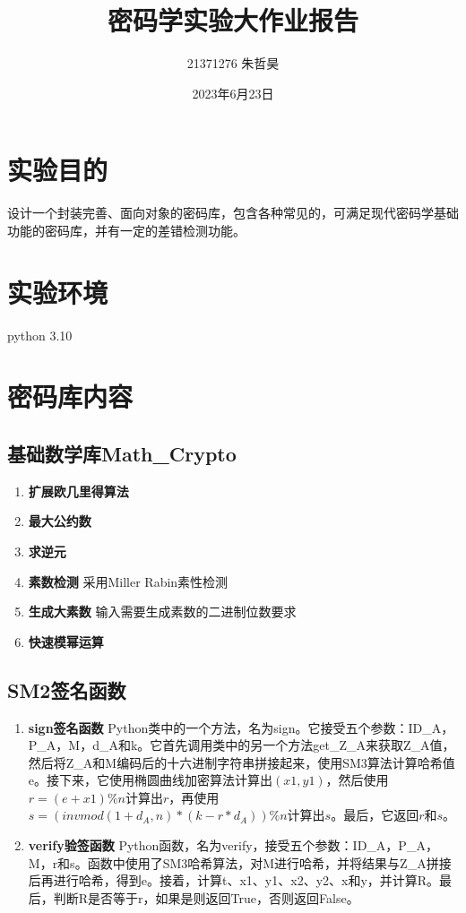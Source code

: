 \documentclass{article}
\title{\textbf{密码学实验大作业报告}}
\author{21371276 朱哲昊}
\date{2023年6月23日}
\begin{document}
	\begin{sloppypar}
	\maketitle\thispagestyle{fancy}
	\section{实验目的}
	设计一个封装完善、面向对象的密码库，包含各种常见的，可满足现代密码学基础功能的密码库，并有一定的差错检测功能。
	\section{实验环境}
	python 3.10
	\section{密码库内容}
	\subsection{基础数学库Math\_Crypto}

	\begin{enumerate}
		\item \textbf{扩展欧几里得算法}
		\item \textbf{最大公约数}
		\item \textbf{求逆元}
		\item \textbf{素数检测} 采用Miller Rabin素性检测
		\item \textbf{生成大素数} 输入需要生成素数的二进制位数要求
		\item \textbf{快速模幂运算} 
	\end{enumerate}
	\subsection{SM2签名函数}
	\begin{enumerate}
		\item \textbf{sign签名函数}
		Python类中的一个方法，名为sign。它接受五个参数：ID\_A，P\_A，M，d\_A和k。它首先调用类中的另一个方法get\_Z\_A来获取Z\_A值，然后将Z\_A和M编码后的十六进制字符串拼接起来，使用SM3算法计算哈希值e。接下来，它使用椭圆曲线加密算法计算出$(x1, y1)$，然后使用$r = (e + x1) \% n$计算出$r$，再使用$s = (invmod(1 + d_A, n) * (k - r * d_A)) \% n$计算出$s$。最后，它返回$r$和$s$。
		\item \textbf{verify验签函数}
		Python函数，名为verify，接受五个参数：ID\_A，P\_A，M，r和s。函数中使用了SM3哈希算法，对M进行哈希，并将结果与Z\_A拼接后再进行哈希，得到e。接着，计算t、x1、y1、x2、y2、x和y，并计算R。最后，判断R是否等于r，如果是则返回True，否则返回False。
	\end{enumerate}

\end{sloppypar}
\end{document}
